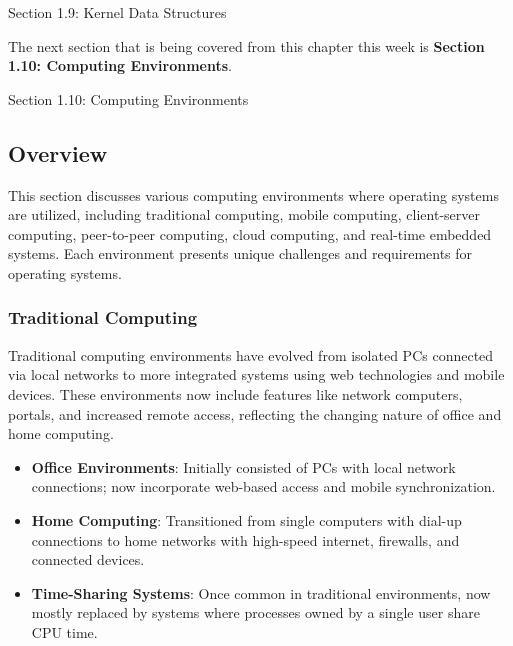 \begin{notes}{Section 1.9: Kernel Data Structures}
\begin{highlight}
    \end{highlight}
\end{notes}

The next section that is being covered from this chapter this week is \textbf{Section 1.10: Computing Environments}.

\begin{notes}{Section 1.10: Computing Environments}
    \subsection*{Overview}

    This section discusses various computing environments where operating systems are utilized, including traditional computing, mobile computing, client-server computing, peer-to-peer computing, 
    cloud computing, and real-time embedded systems. Each environment presents unique challenges and requirements for operating systems.
    
    \subsubsection*{Traditional Computing}
    
    Traditional computing environments have evolved from isolated PCs connected via local networks to more integrated systems using web technologies and mobile devices. These environments now 
    include features like network computers, portals, and increased remote access, reflecting the changing nature of office and home computing.
    
    \begin{highlight}
    
    \begin{itemize}
        \item \textbf{Office Environments}: Initially consisted of PCs with local network connections; now incorporate web-based access and mobile synchronization.
        \item \textbf{Home Computing}: Transitioned from single computers with dial-up connections to home networks with high-speed internet, firewalls, and connected devices.
        \item \textbf{Time-Sharing Systems}: Once common in traditional environments, now mostly replaced by systems where processes owned by a single user share CPU time.
    \end{itemize}
    
    \end{highlight}
    

\end{notes}
